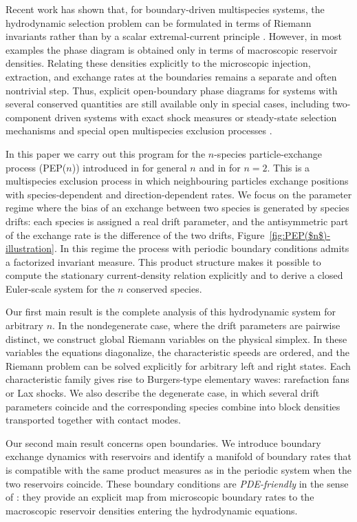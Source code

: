 \documentclass[12pt]{article}
\begin{document}
Recent work has shown that, for boundary-driven multispecies systems, the
hydrodynamic selection problem can be formulated in terms of Riemann
invariants rather than by a scalar extremal-current principle
\cite{Popk04,Cant24,zahra2025hydrodynamics}. However, in most examples the
phase diagram is obtained only in terms of macroscopic reservoir
densities. Relating these densities explicitly to the microscopic
injection, extraction, and exchange rates at the boundaries remains a
separate and often nontrivial step. Thus, explicit open-boundary phase 
diagrams for systems with several
conserved quantities are still available only in special cases, including
two-component driven systems with exact shock measures or steady-state
selection mechanisms and special open multispecies exclusion processes
\cite{Rako04,Brza07,Ayye17,Roy21}.

In this paper we carry out this program for the $n$-species
particle-exchange process (PEP($n$)) introduced in \cite{Schu17}
for general $n$ and in \cite{Toth03} for $n=2$.
This is a
multispecies exclusion process in which neighbouring particles exchange
positions with species-dependent and direction-dependent rates. We focus on
the parameter regime where the bias of an exchange between two species is
generated by species drifts: each species is assigned a real drift parameter,
and the antisymmetric part of the exchange rate is the difference of the
two drifts, Figure~\ref{fig:PEP($n$)-illustration}. In this regime the process with periodic boundary conditions
admits a factorized invariant measure. This product structure makes it
possible to compute the stationary current-density relation explicitly and
to derive a closed Euler-scale system for the $n$ conserved species.

Our first main result is the complete analysis of this hydrodynamic system
for arbitrary $n$. In the nondegenerate case, where the drift parameters
 are pairwise distinct, we construct global Riemann
variables on the physical simplex. In these variables the equations
diagonalize, the characteristic speeds are ordered, and the Riemann problem
can be solved explicitly for arbitrary left and right states. Each
characteristic family gives rise to Burgers-type elementary waves:
rarefaction fans or Lax shocks. We also describe the degenerate case, in
which several drift parameters coincide and the corresponding species
combine into block densities transported together with contact modes.

Our second main result concerns open boundaries. We introduce boundary
exchange dynamics with reservoirs and identify a manifold of boundary
rates that is compatible with the same product measures as in the
periodic system when the two reservoirs coincide. These boundary
conditions are \emph{PDE-friendly} in the sense of \cite{Popk04}: they
provide an explicit map from microscopic boundary rates to the
macroscopic reservoir densities entering the hydrodynamic equations.
\end{document}
